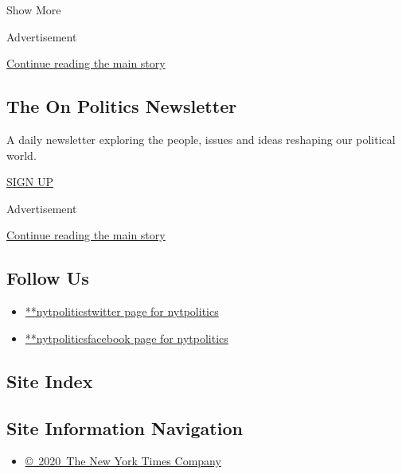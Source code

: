 Show More

Advertisement

\protect\hyperlink{after-mid2}{Continue reading the main story}

\hypertarget{the-on-politics-newsletter}{%
\subsection{The On Politics
Newsletter}\label{the-on-politics-newsletter}}

A daily newsletter exploring the people, issues and ideas reshaping our
political world.

\href{/newsletters/signup/CN}{SIGN UP}

Advertisement

\protect\hyperlink{after-mktg}{Continue reading the main story}

\hypertarget{follow-us}{%
\subsection{Follow Us}\label{follow-us}}

\begin{itemize}
\tightlist
\item
  \href{https://twitter.com/nytpolitics}{**nytpoliticstwitter page for
  nytpolitics}
\item
  \href{https://www.facebookcorewwwi.onion/nytpolitics}{**nytpoliticsfacebook
  page for nytpolitics}
\end{itemize}

\hypertarget{site-index}{%
\subsection{Site Index}\label{site-index}}

\hypertarget{site-information-navigation}{%
\subsection{Site Information
Navigation}\label{site-information-navigation}}

\begin{itemize}
\tightlist
\item
  \href{https://help.nytimes3xbfgragh.onion/hc/en-us/articles/115014792127-Copyright-notice}{©~2020~The
  New York Times Company}
\end{itemize}

